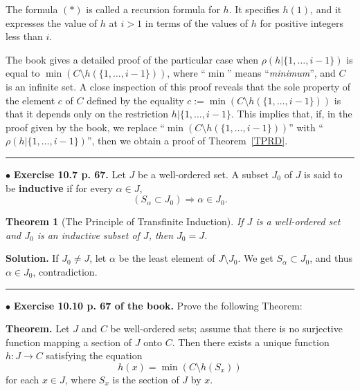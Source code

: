 \documentclass[12pt,letterpaper]{article}
\newtheorem{thm}{Theorem}%
\newcommand{\hs}{\bigskip\hrule\medskip}
\newcommand{\noi}{\noindent}%
\newcommand{\sm}{\setminus}
\begin{document}
The formula $(*)$ is called a recursion formula for $h$. It specifies $h(1)$, and it expresses the value of $h$ at $i > 1$ in terms of the values of $h$ for positive integers less than $i$. 

The book gives a detailed proof of the particular case when $\rho(h|{\{1,\ldots,i-1\}})$ is equal to $\min(C\sm h(\{1,\ldots,i-1\}))$, where ``$\min$'' means ``\emph{minimum}'', and $C$ is an infinite set. A close inspection of this proof reveals that the sole property of the element $c$ of $C$ defined by the equality $c:=\min(C\sm h(\{1,\ldots,i-1\}))$ is that it depends only on the restriction $h|{\{1,\ldots,i-1\}}$. This implies that, if, in the proof given by the book, we replace ``$\min(C\sm h(\{1,\ldots,i-1\}))$'' with ``$\rho(h|{\{1,\ldots,i-1\}})$'', then we obtain a proof of Theorem~\ref{TPRD}. 

\hs

\noi$\bullet$ \textbf{Exercise 10.7 p. 67.} Let $J$ be a well-ordered set. A subset $J_0$ of $J$ is said to be \textbf{inductive} if for every $\alpha \in J$,
\[(S_\alpha \subset J_0) \Rightarrow \alpha \in J_0.\] 

\begin{thm}[The Principle of Transfinite Induction]\label{TPTI1}
If $J$ is a well-ordered set and $J_0$ is an inductive subset of $J$, then $J_0 = J$. 
\end{thm} 

\noi\textbf{Solution.} If $J_0\ne J$, let $\alpha$ be the least element of $J\sm J_0$. We get $S_\alpha \subset J_0$, and thus $\alpha \in J_0$, contradiction. 

\hs

\noi$\bullet$ \textbf{Exercise 10.10 p. 67 of the book.} Prove the following Theorem:  

\noi\textbf{Theorem.} Let $J$ and $C$ be well-ordered sets; assume that there is no surjective function mapping a section of $J$ onto $C$. Then there exists a unique function $h: J \to C$ satisfying the equation
\[h(x) = \min(C\sm h(S_x)) \tag{$\ast$}
\]
for each $x \in J$, where $S_x$ is the section of $J$ by $x$. 
\end{document}
